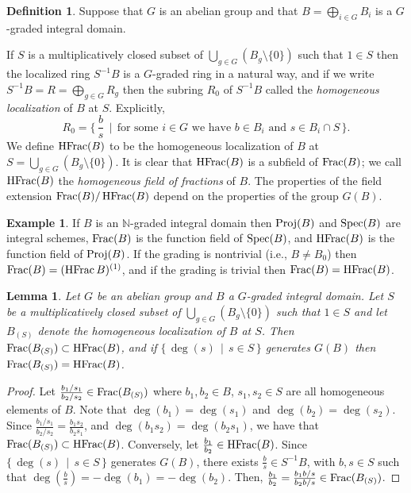 \documentclass[12pt]{amsart}
\theoremstyle{plain}
\newtheorem{lemma}[subsection]{Lemma}
\theoremstyle{definition}
\newtheorem{definition}[subsection]{Definition}
\newtheorem{example}[subsection]{Example}
\newcommand{\Spec}{		\operatorname{{\rm Spec}}}
\newcommand{\Proj}{		\operatorname{{\rm Proj}}}
\newcommand{\Frac}{		\operatorname{{\rm Frac}}}
\newcommand{\HFrac}{		\operatorname{{\rm HFrac}}}
\newcommand{\setspec}[2]{\big\{\,#1\, \mid \,#2\, \big\}}
\newcommand{\Nat}{\ensuremath{\mathbb{N}}}
\begin{document}
	\begin{definition}
		Suppose that $G$ is an abelian group and that  $B = \bigoplus_{i \in G} B_i$ is a $G$-graded integral domain.
		
		If $S$ is a multiplicatively closed subset of $\bigcup_{g \in G} ( B_g \setminus \{0\})$ such that $1 \in S$ then the localized ring
		$S^{-1}B$ is a $G$-graded ring in a natural way, and if we write $S^{-1}B = R = \bigoplus_{g \in G} R_g$ then
		the subring $R_0$ of $S^{-1}B$ called the \textit{homogeneous localization} of $B$ at $S$.
		Explicitly,
		$$
		R_0 = \setspec{ \textstyle \frac bs }{ \text{for some $i \in G$ we have $b \in B_i$ and $s \in B_i \cap S$} } .
		$$
		We define $\HFrac(B)$ to be the homogeneous localization of $B$ at $S = \bigcup_{g \in G} ( B_g \setminus \{0\})$.
		It is clear that $\HFrac(B)$ is a subfield of $\Frac(B)$;
		we call $\HFrac(B)$ the \textit{homogeneous field of fractions} of $B$.
		The properties of the field extension $\Frac(B) / \HFrac(B)$ depend on the properties of the group $G(B)$.
	\end{definition}
	
	\begin{example} \label{HFracExample}
		If $B$ is an $\Nat$-graded integral domain then $\Proj(B)$ and $\Spec(B)$ are integral schemes,
		$\Frac(B)$ is the function field of $\Spec(B)$, and $\HFrac(B)$ is the function field of $\Proj(B)$.
		If the grading is nontrivial (i.e., $B \neq B_0$) then $\Frac(B) = (\HFrac B)^{(1)}$,
		and if the grading is trivial then $\Frac(B) = \HFrac(B)$.
	\end{example}
		
	\begin{lemma} \label {0dfvfb03eFfj}
		Let $G$ be an abelian group and $B$ a $G$-graded integral domain.
		Let $S$ be a multiplicatively closed subset of  $\bigcup_{g \in G} ( B_g \setminus \{0\})$ such that $1 \in S$
		and let $B_{(S)}$ denote the homogeneous localization of $B$ at $S$.
		Then $\Frac(B_{(S)}) \subset \HFrac(B)$, and if $\setspec{ \deg(s) }{ s \in S}$ generates $G(B)$ then
		$\Frac(B_{(S)}) = \HFrac(B)$.
	\end{lemma}
	
	\begin{proof}
		Let $\frac{b_1/s_1}{b_2/s_2} \in \Frac(B_{(S)})$ where $b_1,b_2 \in B$, $s_1,s_2 \in S$ are all homogeneous elements of $B$. Note that $\deg(b_1) = \deg(s_1)$ and $\deg(b_2) = \deg(s_2)$. Since $\frac{b_1/s_1}{b_2/s_2} = \frac{b_1 s_2}{b_2 s_1}$, and $\deg(b_1s_2) = \deg(b_2 s_1)$, we have that $\Frac(B_{(S)}) \subset \HFrac(B)$. Conversely, let $\frac{b_1}{b_2} \in \HFrac(B)$. Since $\setspec{ \deg(s) }{ s \in S}$ generates $G(B)$, there exists $\frac{b}{s} \in S^{-1}B$, with $b,s \in S$ such that $\deg(\frac{b}{s}) = -\deg(b_1) = -\deg(b_2)$. Then, $ \frac{b_1}{b_2} = \frac{b_1 b / s}{b_2 b / s} \in \Frac(B_{(S)})$.     
	\end{proof}
	
\end{document}
